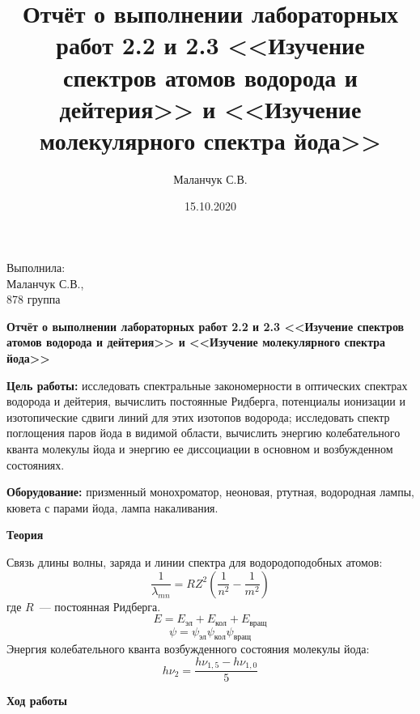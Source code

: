 \documentclass[12pt]{article}
\title{Отчёт о выполнении лабораторных работ 2.2 и 2.3 <<Изучение спектров
  атомов водорода и дейтерия>> и <<Изучение молекулярного спектра йода>>}
\author{Маланчук С.В.}
\date{15.10.2020}
\begin{document}
\begin{flushright}
    Выполнила:
    \\
    Маланчук С.В.,
    \\
    878 группа
\end{flushright}

\begin{center}
    \begin{Large}
        \textbf{Отчёт о выполнении лабораторных работ 2.2 и 2.3 <<Изучение спектров
          атомов водорода и дейтерия>> и <<Изучение молекулярного спектра йода>>}
    \end{Large}
\end{center}


\parindent=1cm \textbf{Цель работы:} исследовать спектральные закономерности в
оптических спектрах водорода и дейтерия, вычислить постоянные Ридберга,
потенциалы ионизации и изотопические сдвиги линий для этих изотопов водорода;
исследовать спектр поглощения паров йода в видимой области, вычислить энергию
колебательного кванта молекулы йода и энергию ее диссоциации в основном и
возбужденном состояниях.

\parindent=1cm \textbf{Оборудование:} призменный монохроматор, неоновая,
ртутная, водородная лампы, кювета с парами йода, лампа накаливания.

\begin{center}
    \textbf{Теория}
\end{center}
Связь длины волны, заряда и линии спектра для водородоподобных атомов:
\begin{equation}
    \label{eq:(1)}
    \frac{1}{\lambda_{mn}} = RZ^2\left( \frac{1}{n^2} - \frac{1}{m^2} \right)
\end{equation}
где $R$~--- постоянная Ридберга.
\begin{equation}
    \label{eq:(2)}
    E = E_{\text{эл}} + E_{\text{кол}} + E_{\text{вращ}}
\end{equation}
\begin{equation}
    \label{eq:(3)}
    \psi = \psi_{\text{эл}}\psi_{\text{кол}}\psi_{\text{вращ}}
\end{equation}
Энергия колебательного кванта возбужденного состояния молекулы йода:
\begin{equation}
    \label{eq:(4)}
    h\nu_2 = \frac{h\nu_{1,5}-h\nu_{1,0}}{5}
\end{equation}
\newpage
\begin{center}
    \textbf{Ход работы}
\end{center}
\end{document}
